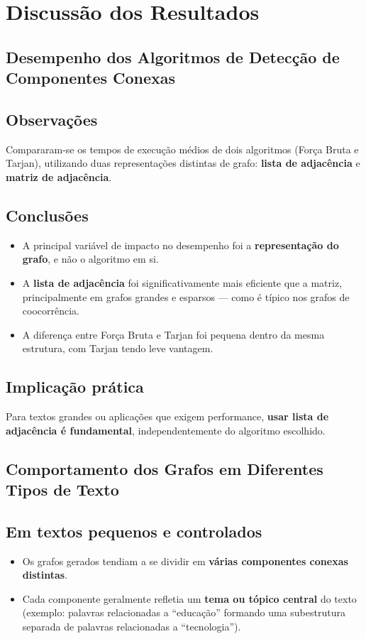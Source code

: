 \documentclass[12pt]{article}
\begin{document}
\section{Discussão dos Resultados}

\subsection{Desempenho dos Algoritmos de Detecção de Componentes Conexas}

\subsection*{Observações}
Compararam-se os tempos de execução médios de dois algoritmos (Força Bruta e Tarjan), utilizando duas representações distintas de grafo: \textbf{lista de adjacência} e \textbf{matriz de adjacência}.

\subsection*{Conclusões}
\begin{itemize}
    \item A principal variável de impacto no desempenho foi a \textbf{representação do grafo}, e não o algoritmo em si.
    \item A \textbf{lista de adjacência} foi significativamente mais eficiente que a matriz, principalmente em grafos grandes e esparsos — como é típico nos grafos de coocorrência.
    \item A diferença entre Força Bruta e Tarjan foi pequena dentro da mesma estrutura, com Tarjan tendo leve vantagem.
\end{itemize}

\subsection*{Implicação prática}
Para textos grandes ou aplicações que exigem performance, \textbf{usar lista de adjacência é fundamental}, independentemente do algoritmo escolhido.

\subsection{Comportamento dos Grafos em Diferentes Tipos de Texto}

\subsection*{Em textos pequenos e controlados}
\begin{itemize}
    \item Os grafos gerados tendiam a se dividir em \textbf{várias componentes conexas distintas}.
    \item Cada componente geralmente refletia um \textbf{tema ou tópico central} do texto (exemplo: palavras relacionadas a ``educação'' formando uma subestrutura separada de palavras relacionadas a ``tecnologia'').
\end{itemize}
\end{document}
